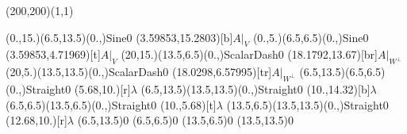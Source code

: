 \unitlength=1bp%

\begin{feynartspicture}(200,200)(1,1)

\FADiagram{}
\FAProp(0.,15.)(6.5,13.5)(0.,){Sine}{0}
\FALabel(3.59853,15.2803)[b]{$A|_V$}
\FAProp(0.,5.)(6.5,6.5)(0.,){Sine}{0}
\FALabel(3.59853,4.71969)[t]{$A|_V$}
\FAProp(20,15.)(13.5,6.5)(0.,){ScalarDash}{0}
\FALabel(18.1792,13.67)[br]{$A|_{W^\perp}$}
\FAProp(20,5.)(13.5,13.5)(0.,){ScalarDash}{0}
\FALabel(18.0298,6.57995)[tr]{$A|_{W^\perp}$}
\FAProp(6.5,13.5)(6.5,6.5)(0.,){Straight}{0}
\FALabel(5.68,10.)[r]{$\lambda$}
\FAProp(6.5,13.5)(13.5,13.5)(0.,){Straight}{0}
\FALabel(10.,14.32)[b]{$\lambda$}
\FAProp(6.5,6.5)(13.5,6.5)(0.,){Straight}{0}
\FALabel(10.,5.68)[t]{$\lambda$}
\FAProp(13.5,6.5)(13.5,13.5)(0.,){Straight}{0}
\FALabel(12.68,10.)[r]{$\lambda$}
\FAVert(6.5,13.5){0}
\FAVert(6.5,6.5){0}
\FAVert(13.5,6.5){0}
\FAVert(13.5,13.5){0}
\end{feynartspicture}

